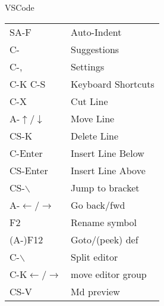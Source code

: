\begin{conceptbox}[white]{VSCode}
\begin{tabular}{ll}
  SA-F&Auto-Indent\\
  C-\textvisiblespace&Suggestions\\
  C-,&Settings\\
  C-K C-S&Keyboard Shortcuts\\
  C-X&Cut Line\\
  A-$\uparrow$/$\downarrow$&Move Line\\
  CS-K&Delete Line\\
  C-Enter&Insert Line Below\\
  CS-Enter&Insert Line Above\\
  CS-$\backslash$ &Jump to bracket\\
  A-$\leftarrow$/$\rightarrow$&Go back/fwd\\
  F2 &Rename symbol\\
  (A-)F12 &Goto/(peek) def\\
  C-$\backslash$&Split editor\\
  C-K$\leftarrow$/$\rightarrow$&move editor group\\
  CS-V&Md preview\\
\end{tabular}
\end{conceptbox}
